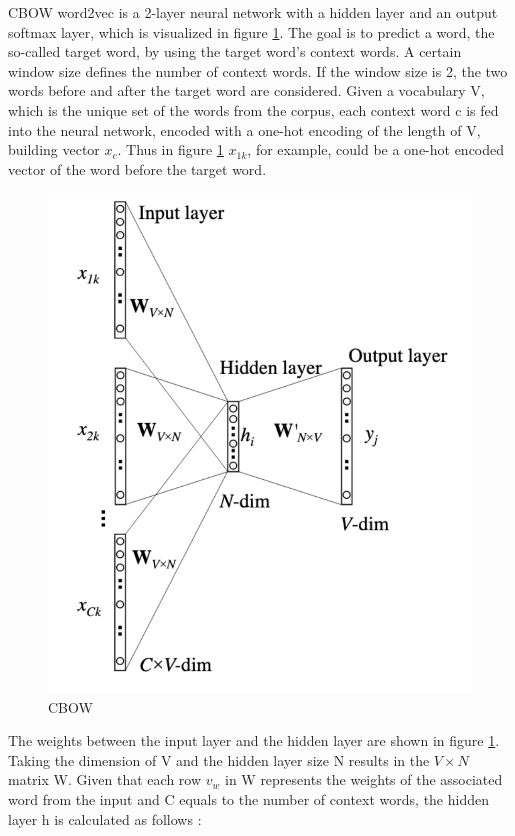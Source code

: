 \documentclass[12pt, a4paper, titlepage]{article}
\begin{document}
\ac{CBOW} word2vec is a 2-layer neural network with a hidden layer and an output softmax layer, which is visualized in figure \ref{fig: F1}. The goal is to predict a word, the so-called target word, by using the target word's context words. A certain window size defines the number of context words. If the window size is 2, the two words before and after the target word are considered. Given a vocabulary V, which is the unique set of the words from the corpus, each context word c is fed into the neural network, encoded with a one-hot encoding of the length of V, building vector $x_c$. Thus in figure \ref*{fig: F1} $x_{1k}$, for example, could be a one-hot encoded vector of the word before the target word. 

\begin{figure}[]
  \center
  \includegraphics[scale=0.5]{word2vecCBOW.png}
  \caption{\label{fig: F1} \ac{CBOW} \citep[6]{rong2014}}
\end{figure}

The weights between the input layer and the hidden layer are shown in figure \ref{fig: F1}. Taking the dimension of V and the hidden layer size N results in the $V \times N$ matrix W. Given that each row $v_w$ in W represents the weights of the associated word from the input and C equals to the number of context words, the hidden layer h is calculated as follows \citep{rong2014}:
\end{document}
